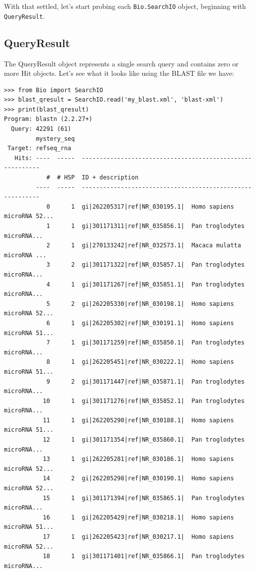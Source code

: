 \documentclass{report}
\begin{document}
With that settled, let's start probing each \verb|Bio.SearchIO| object,
beginning with \verb|QueryResult|.

\subsection{QueryResult}
\label{sec:searchio-qresult}

The QueryResult object represents a single search query and contains zero or
more Hit objects. Let's see what it looks like using the BLAST file we have:

\begin{verbatim}
>>> from Bio import SearchIO
>>> blast_qresult = SearchIO.read('my_blast.xml', 'blast-xml')
>>> print(blast_qresult)
Program: blastn (2.2.27+)
  Query: 42291 (61)
         mystery_seq
 Target: refseq_rna
   Hits: ----  -----  ----------------------------------------------------------
            #  # HSP  ID + description
         ----  -----  ----------------------------------------------------------
            0      1  gi|262205317|ref|NR_030195.1|  Homo sapiens microRNA 52...
            1      1  gi|301171311|ref|NR_035856.1|  Pan troglodytes microRNA...
            2      1  gi|270133242|ref|NR_032573.1|  Macaca mulatta microRNA ...
            3      2  gi|301171322|ref|NR_035857.1|  Pan troglodytes microRNA...
            4      1  gi|301171267|ref|NR_035851.1|  Pan troglodytes microRNA...
            5      2  gi|262205330|ref|NR_030198.1|  Homo sapiens microRNA 52...
            6      1  gi|262205302|ref|NR_030191.1|  Homo sapiens microRNA 51...
            7      1  gi|301171259|ref|NR_035850.1|  Pan troglodytes microRNA...
            8      1  gi|262205451|ref|NR_030222.1|  Homo sapiens microRNA 51...
            9      2  gi|301171447|ref|NR_035871.1|  Pan troglodytes microRNA...
           10      1  gi|301171276|ref|NR_035852.1|  Pan troglodytes microRNA...
           11      1  gi|262205290|ref|NR_030188.1|  Homo sapiens microRNA 51...
           12      1  gi|301171354|ref|NR_035860.1|  Pan troglodytes microRNA...
           13      1  gi|262205281|ref|NR_030186.1|  Homo sapiens microRNA 52...
           14      2  gi|262205298|ref|NR_030190.1|  Homo sapiens microRNA 52...
           15      1  gi|301171394|ref|NR_035865.1|  Pan troglodytes microRNA...
           16      1  gi|262205429|ref|NR_030218.1|  Homo sapiens microRNA 51...
           17      1  gi|262205423|ref|NR_030217.1|  Homo sapiens microRNA 52...
           18      1  gi|301171401|ref|NR_035866.1|  Pan troglodytes microRNA...

\end{verbatim}
\end{document}
